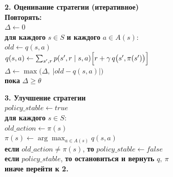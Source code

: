 \begin{solution}
    \textbf{2. Оценивание стратегии (итеративное)}\\
    \textbf{Повторять:}\\
    \hspace*{5mm} $\Delta \leftarrow 0$\\
    \hspace*{5mm} \textbf{для каждого } $s\in S$ \textbf{и каждого } $a\in A(s)$:\\
    \hspace*{5mm}\hspace*{5mm} $old \leftarrow q(s,a)$\\
    \hspace*{5mm}\hspace*{5mm} $q(s,a)\leftarrow 
    \sum_{s',r} p(s',r\mid s,a)\Bigl[r+\gamma\, q\bigl(s',\pi(s')\bigr)\Bigr]$\\
    \hspace*{5mm}\hspace*{5mm} $\Delta \leftarrow \max\bigl(\Delta,\ |old-q(s,a)|\bigr)$\\
    \textbf{пока } $\Delta \ge \theta$
    
    \textbf{3. Улучшение стратегии}\\
    $policy\_stable \leftarrow true$\\
    \textbf{для каждого } $s\in S$:\\
    \hspace*{5mm} $old\_action \leftarrow \pi(s)$\\
    \hspace*{5mm} $\pi(s)\leftarrow \arg\max_{a\in A(s)} q(s,a)$\\
    \hspace*{5mm} \textbf{если } $old\_action \ne \pi(s)$, \textbf{то } $policy\_stable \leftarrow false$\\
    \textbf{если } $policy\_stable$, \textbf{то остановиться и вернуть} $q, \ \pi$\\
    \textbf{иначе перейти к 2.}
\end{solution}

